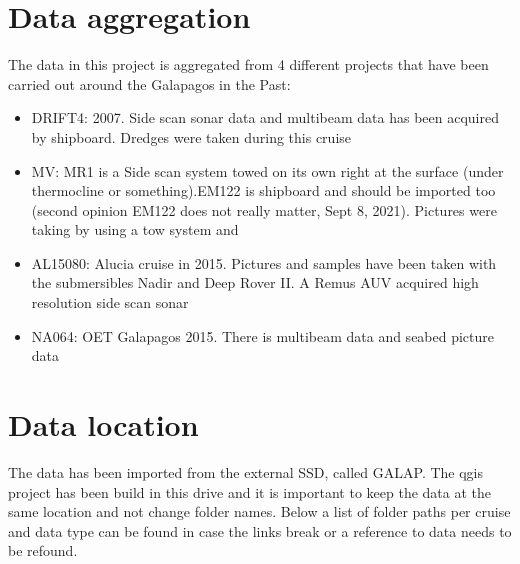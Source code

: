 \documentclass[letterpaper,10pt,english]{sphinxmanual}
\begin{document}
\section{Data aggregation}
\label{\detokenize{02_folder_hierarchy:data-aggregation}}
\sphinxAtStartPar
The data in this project is aggregated from 4 different projects that have been carried out around the Galapagos in the Past:
\begin{itemize}
\item {} 
\sphinxAtStartPar
DRIFT4: 2007. Side scan sonar data and multibeam data has been acquired by shipboard. Dredges were taken during this cruise

\item {} 
\sphinxAtStartPar
MV: MR1 is a Side scan system towed on its own right at the surface (under thermocline or something).EM122 is shipboard and should be imported too (second opinion EM122 does not really matter, Sept 8, 2021). Pictures were taking by using a tow system and

\item {} 
\sphinxAtStartPar
AL15080: Alucia cruise in 2015. Pictures and samples have been taken with the submersibles Nadir and Deep Rover II. A Remus AUV acquired high resolution side scan sonar

\item {} 
\sphinxAtStartPar
NA064: OET Galapagos 2015. There is multibeam data and seabed picture data

\end{itemize}


\section{Data location}
\label{\detokenize{02_folder_hierarchy:data-location}}
\sphinxAtStartPar
The data has been imported from the external SSD, called GALAP. The qgis project has been build in this drive and it is important to keep the data at the same location and not change folder names. Below a list of folder paths per cruise and data type can be found in case the links break or a reference to data needs to be refound.
\end{document}
